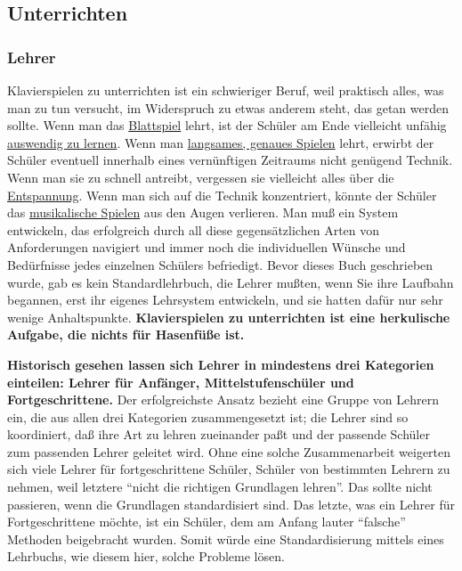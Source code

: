 
\subsection{Unterrichten}
\label{c1iii16}

\subsubsection{Lehrer}
\label{c1iii16a}

Klavierspielen zu unterrichten ist ein schwieriger Beruf, weil praktisch alles, was man zu tun versucht, im Widerspruch zu etwas anderem steht, das getan werden sollte.
Wenn man das \hyperref[c1iii11]{Blattspiel} lehrt, ist der Schüler am Ende vielleicht unfähig \hyperref[c1iii6]{auswendig zu lernen}.
Wenn man \hyperref[c1ii17]{langsames, genaues Spielen} lehrt, erwirbt der Schüler eventuell innerhalb eines vernünftigen Zeitraums nicht genügend Technik.
Wenn man sie zu schnell antreibt, vergessen sie vielleicht alles über die \hyperref[c1ii14]{Entspannung}.
Wenn man sich auf die Technik konzentriert, könnte der Schüler das \hyperref[c1iii14d]{musikalische Spielen} aus den Augen verlieren.
Man muß ein System entwickeln, das erfolgreich durch all diese gegensätzlichen Arten von Anforderungen navigiert und immer noch die individuellen Wünsche und Bedürfnisse jedes einzelnen Schülers befriedigt.
Bevor dieses Buch geschrieben wurde, gab es kein Standardlehrbuch, die Lehrer mußten, wenn Sie ihre Laufbahn begannen, erst ihr eigenes Lehrsystem entwickeln, und sie hatten dafür nur sehr wenige Anhaltspunkte.
\textbf{Klavierspielen zu unterrichten ist eine herkulische Aufgabe, die nichts für Hasenfüße ist.}

\textbf{Historisch gesehen lassen sich Lehrer in mindestens drei Kategorien einteilen: Lehrer für Anfänger, Mittelstufenschüler und Fortgeschrittene.}
Der erfolgreichste Ansatz bezieht eine Gruppe von Lehrern ein, die aus allen drei Kategorien zusammengesetzt ist; die Lehrer sind so koordiniert, daß ihre Art zu lehren zueinander paßt und der passende Schüler zum passenden Lehrer geleitet wird.
Ohne eine solche Zusammenarbeit weigerten sich viele Lehrer für fortgeschrittene Schüler, Schüler von bestimmten Lehrern zu nehmen, weil letztere \enquote{nicht die richtigen Grundlagen lehren}.
Das sollte nicht passieren, wenn die Grundlagen standardisiert sind.
Das letzte, was ein Lehrer für Fortgeschrittene möchte, ist ein Schüler, dem am Anfang lauter \enquote{falsche} Methoden beigebracht wurden.
Somit würde eine Standardisierung mittels eines Lehrbuchs, wie diesem hier, solche Probleme lösen.


